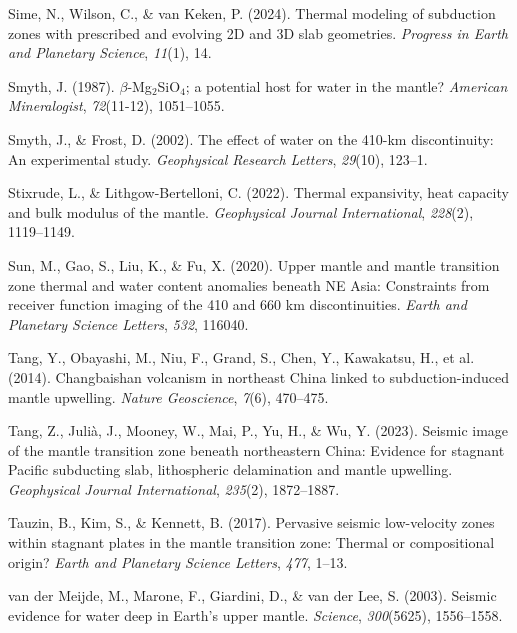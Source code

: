 \documentclass[draft,linenumbers]{agujournal2019}
\newlength{\cslhangindent}
\newenvironment{CSLReferences}[2]
 {\begin{list}{}{
  \setlength{\itemindent}{0pt}
  \setlength{\leftmargin}{0pt}
  \setlength{\parsep}{0pt}
  \ifodd #1
   \setlength{\leftmargin}{\cslhangindent}
   \setlength{\itemindent}{-\cslhangindent}
  \fi
  \setlength{\itemsep}{#2\baselineskip}
  }
  \item\relax}
 {\end{list}}
\begin{document}
\begin{CSLReferences}{1}{0}
{Sime, N., Wilson, C., \& van Keken, P.} (2024). Thermal modeling of
subduction zones with prescribed and evolving 2D and 3D slab geometries.
\emph{Progress in Earth and Planetary Science}, \emph{11}(1), 14.

Smyth, J. (1987). {\(\beta\)-Mg\(_2\)SiO\(_4\)}; a potential host for
water in the mantle? \emph{American Mineralogist}, \emph{72}(11-12),
1051--1055.

Smyth, J., \& Frost, D. (2002). The effect of water on the 410-km
discontinuity: An experimental study. \emph{Geophysical Research
Letters}, \emph{29}(10), 123--1.

Stixrude, L., \& Lithgow-Bertelloni, C. (2022). Thermal expansivity,
heat capacity and bulk modulus of the mantle. \emph{Geophysical Journal
International}, \emph{228}(2), 1119--1149.

Sun, M., Gao, S., Liu, K., \& Fu, X. (2020). Upper mantle and mantle
transition zone thermal and water content anomalies beneath {NE Asia}:
Constraints from receiver function imaging of the 410 and 660 km
discontinuities. \emph{Earth and Planetary Science Letters}, \emph{532},
116040.

Tang, Y., Obayashi, M., Niu, F., Grand, S., Chen, Y., Kawakatsu, H., et
al. (2014). {Changbaishan} volcanism in northeast {China} linked to
subduction-induced mantle upwelling. \emph{Nature Geoscience},
\emph{7}(6), 470--475.

Tang, Z., Julià, J., Mooney, W., Mai, P., Yu, H., \& Wu, Y. (2023).
Seismic image of the mantle transition zone beneath northeastern
{China}: Evidence for stagnant {Pacific} subducting slab, lithospheric
delamination and mantle upwelling. \emph{Geophysical Journal
International}, \emph{235}(2), 1872--1887.

Tauzin, B., Kim, S., \& Kennett, B. (2017). Pervasive seismic
low-velocity zones within stagnant plates in the mantle transition zone:
Thermal or compositional origin? \emph{Earth and Planetary Science
Letters}, \emph{477}, 1--13.

{van der Meijde, M., Marone, F., Giardini, D., \& van der Lee, S.}
(2003). Seismic evidence for water deep in {Earth}'s upper mantle.
\emph{Science}, \emph{300}(5625), 1556--1558.


\end{CSLReferences}
\end{document}

